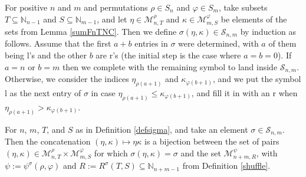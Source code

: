 \documentclass[10pt,a4paper]{amsart}
\begin{document}
\begin{defn}
For positive $n$ and $m$ and permutations $\rho \in S_{n}$ and $\varphi \in S_{m}$, take subsets $T\subseteq\mathbb{N}_{n-1}$ and $S\subseteq\mathbb{N}_{m-1}$, and let $\eta\in\mathcal{M}_{n,T}^{\rho}$ and $\kappa\in\mathcal{M}_{m,S}^{\varphi}$ be elements of the sets from Lemma \ref{sumFnTNC}. Then we define $\sigma(\eta,\kappa)\in\mathcal{S}_{n,m}$ by induction as follows. Assume that the first $a+b$ entries in $\sigma$ were determined, with $a$ of them being l's and the other $b$ are r's (the initial step is the case where $a=b=0$). If $a=n$ or $b=m$ then we complete with the remaining symbol to land inside $\mathcal{S}_{n,m}$. Otherwise, we consider the indices $\eta_{\rho(a+1)}$ and $\kappa_{\varphi(b+1)}$, and we put the symbol l as the next entry of $\sigma$ in case $\eta_{\rho(a+1)}\leq\kappa_{\varphi(b+1)}$, and fill it in with an r when $\eta_{\rho(a+1)}>\kappa_{\varphi(b+1)}$. \label{defsigma}
\end{defn}

\begin{lem}
For $n$, $m$, $T$, and $S$ as in Definition \ref{defsigma}, and take an element $\sigma\in\mathcal{S}_{n,m}$. Then the concatenation $(\eta,\kappa)\mapsto\eta\kappa$ is a bijection between the set of pairs $(\eta,\kappa)\in\mathcal{M}_{n,T}^{\rho}\times\mathcal{M}_{m,S}^{\varphi}$ for which $\sigma(\eta,\kappa)=\sigma$ and the set $\mathcal{M}_{n+m,R}^{\psi}$, with $\psi:=\psi^{\sigma}(\rho,\varphi)$ and $R:=R^{\sigma}(T,S)\subseteq\mathbb{N}_{n+m-1}$ from Definition \ref{shuffle}. \label{matchsigma}
\end{lem}
\end{document}

